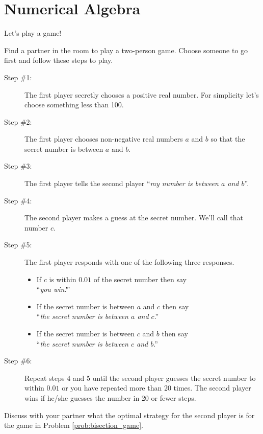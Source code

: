 \chapter{Numerical Algebra}\label{ch:numerical_algebra}
Let's play a game!
\begin{problem}\label{prob:bisection_game}
    Find a partner in the room to play a two-person game.  Choose someone to go first and
    follow these steps to play.
    \begin{description}
        \item[Step \#1:] The first player secretly chooses a positive real number. For
            simplicity let's choose something less than 100.
        \item[Step \#2:] The first player chooses non-negative real numbers $a$ and $b$ so that the
            secret number is between $a$ and $b$.  
        \item[Step \#3:] The first player tells the second player ``{\it my number is between $a$
            and $b$}''.
        \item[Step \#4:] The second player makes a guess at the secret number.  We'll call
            that number $c$.
        \item[Step \#5:] The first player responds with one of the following three
            responses.
            \begin{itemize}
                \item If $c$ is within $0.01$ of the secret number then say\\ ``{\it you win!}''
                \item If the secret number is between $a$ and $c$ then say\\ ``{\it the secret
                number is between $a$ and $c$}.''
                \item If the secret number is between $c$ and $b$ then say\\ ``{\it the secret
                number is between $c$ and $b$}.''
            \end{itemize}
        \item[Step \#6:] Repeat steps 4 and 5 until the second player guesses the secret
            number to within $0.01$ or you have repeated more than 20 times. The second
            player wins if he/she guesses the number in 20 or fewer steps.
    \end{description}
\end{problem}

\begin{problem}
    Discuss with your partner what the optimal strategy for the second player is for the
    game in Problem \ref{prob:bisection_game}.
\end{problem}

